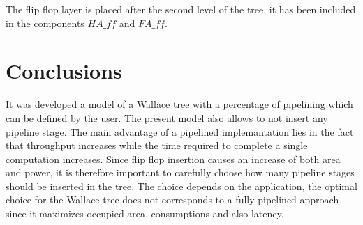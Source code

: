 The flip flop layer is placed after the second level of the tree, it has been included in the components $HA\_ff$ and $FA\_ff$.

\section{Conclusions}
It was developed a model of a Wallace tree with a percentage of pipelining which can be defined by the user. The present model also allows to not insert any pipeline stage. 
The main advantage of a pipelined implemantation lies in the fact that throughput increases while the time required to complete a single computation increases. 
Since flip flop insertion causes an increase of both area and power, it is therefore important to carefully choose how many pipeline stages should be inserted in the tree. 
The choice depends on the application, the optimal choice for the Wallace tree does not corresponds to a fully pipelined approach since it maximizes occupied area, consumptions and also latency.





